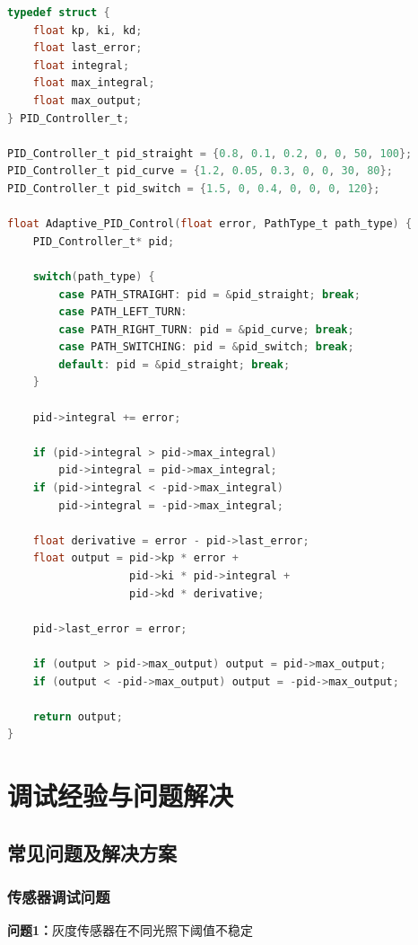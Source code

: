 \documentclass[UTF8]{ctexart}
\begin{document}
\begin{lstlisting}[language=C, caption={自适应PID控制器}, label={lst:adaptive_pid}]
typedef struct {
    float kp, ki, kd;
    float last_error;
    float integral;
    float max_integral;
    float max_output;
} PID_Controller_t;

PID_Controller_t pid_straight = {0.8, 0.1, 0.2, 0, 0, 50, 100};
PID_Controller_t pid_curve = {1.2, 0.05, 0.3, 0, 0, 30, 80};
PID_Controller_t pid_switch = {1.5, 0, 0.4, 0, 0, 0, 120};

float Adaptive_PID_Control(float error, PathType_t path_type) {
    PID_Controller_t* pid;
    
    switch(path_type) {
        case PATH_STRAIGHT: pid = &pid_straight; break;
        case PATH_LEFT_TURN:
        case PATH_RIGHT_TURN: pid = &pid_curve; break;
        case PATH_SWITCHING: pid = &pid_switch; break;
        default: pid = &pid_straight; break;
    }
    
    pid->integral += error;
    
    if (pid->integral > pid->max_integral) 
        pid->integral = pid->max_integral;
    if (pid->integral < -pid->max_integral) 
        pid->integral = -pid->max_integral;
    
    float derivative = error - pid->last_error;
    float output = pid->kp * error + 
                   pid->ki * pid->integral + 
                   pid->kd * derivative;
    
    pid->last_error = error;
    
    if (output > pid->max_output) output = pid->max_output;
    if (output < -pid->max_output) output = -pid->max_output;
    
    return output;
}
\end{lstlisting}

\section{调试经验与问题解决}

\subsection{常见问题及解决方案}

\subsubsection{传感器调试问题}

\textbf{问题1：}灰度传感器在不同光照下阈值不稳定
\end{document}
